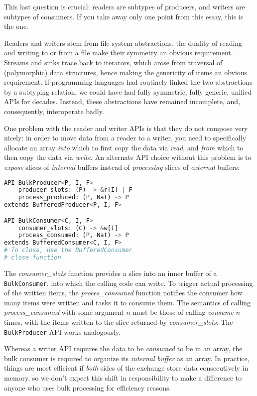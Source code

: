 \documentclass[sigplan,screen,10pt,review]{acmart}
\begin{document}
This last question is crucial: readers are subtypes of producers, and writers are subtypes of consumers. If you take away only one point from this essay, this is the one.

Readers and writers stem from file system abstractions, the duality of reading and writing to or from a file make their symmetry an obvious requirement. Streams and sinks trace back to iterators, which arose from traversal of (polymorphic) data structures, hence making the genericity of items an obvious requirement. If programming languages had routinely linked the two abstractions by a subtyping relation, we could have had fully symmetric, fully generic, unified APIs for decades. Instead, these abstractions have remained incomplete, and, consequently, interoperate badly.

One problem with the reader and writer APIs is that they do not compose very nicely: in order to move data from a reader to a writer, you need to specifically allocate an array \textit{into} which to first copy the data via \textit{read}, and \textit{from} which to then copy the data via \textit{write}. An alternate API choice without this problem is to \textit{expose} slices of \textit{internal} buffers instead of \textit{processing} slices of \textit{external} buffers:

\begin{lstlisting}[language=Python]
API BulkProducer<P, I, F>
    producer_slots: (P) -> &r[I] | F
    process_produced: (P, Nat) -> P
extends BufferedProducer<P, I, F>

API BulkConsumer<C, I, F>
    consumer_slots: (C) -> &w[I]
    process_consumed: (P, Nat) -> P
extends BufferedConsumer<C, I, F>
# To close, use the BufferedConsumer
# close function
\end{lstlisting}

The \textit{consumer\_slots} function provides a slice into an inner buffer of a \texttt{BulkConsumer}, into which the calling code can write. To trigger actual processing of the written items, the \textit{proces\_consumed} function notifies the consumer how many items were written and tasks it to consume them. The semantics of calling \textit{process\_consumed} with some argument $n$ must be those of calling \textit{consume} $n$ times, with the items written to the slice returned by \textit{consumer\_slots}. The \texttt{BulkProducer} API works analogously.

Whereas a writer API requires the data to be \textit{consumed} to be in an array, the bulk consumer is required to organize its \textit{internal buffer} as an array. In practice, things are most efficient if \textit{both} sides of the exchange store data consecutively in memory, so we don't expect this shift in responsibility to make a difference to anyone who uses bulk processing for efficiency reasons.
\end{document}
